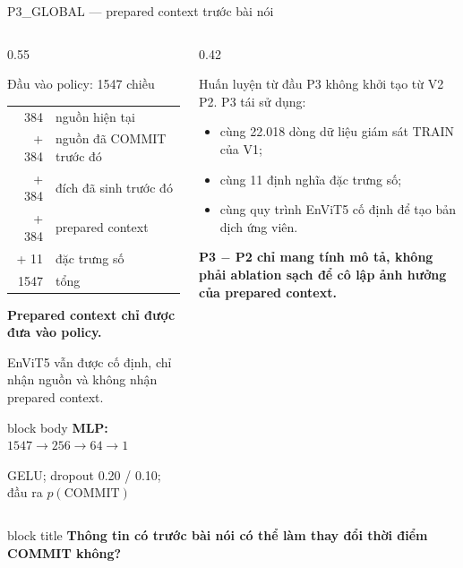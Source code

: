 \documentclass[aspectratio=169,11pt]{beamer}
\begin{document}
\begin{frame}{P3\_GLOBAL --- prepared context trước bài nói}
  \begin{columns}[T,onlytextwidth]
    \begin{column}{0.55\textwidth}
      \begin{block}{Đầu vào policy: 1547 chiều}
        \scriptsize
        \begin{tabular}{@{}rl@{}}
          384 & nguồn hiện tại \\
          + 384 & nguồn đã COMMIT trước đó \\
          + 384 & đích đã sinh trước đó \\
          + 384 & prepared context \\
          + 11 & đặc trưng số \\
          \midrule
          1547 & tổng
        \end{tabular}
      \end{block}
      \scriptsize
      \textbf{Prepared context chỉ được đưa vào policy.}\par
      EnViT5 vẫn được cố định, chỉ nhận nguồn và không nhận prepared context.
      \vspace{0.45em}
      \begin{beamercolorbox}[rounded=true,sep=0.45em,center]{block body}
        \textbf{MLP:} $1547 \rightarrow 256 \rightarrow 64 \rightarrow 1$\par
        \scriptsize GELU; dropout 0.20 / 0.10; đầu ra $p(\mathrm{COMMIT})$
      \end{beamercolorbox}
    \end{column}
    \begin{column}{0.42\textwidth}
      \begin{alertblock}{Huấn luyện từ đầu}
        \scriptsize P3 không khởi tạo từ V2 P2. P3 tái sử dụng:
        \begin{itemize}
          \item cùng 22.018 dòng dữ liệu giám sát TRAIN của V1;
          \item cùng 11 định nghĩa đặc trưng số;
          \item cùng quy trình EnViT5 cố định để tạo bản dịch ứng viên.
        \end{itemize}
      \end{alertblock}
      \centering\small
      \textbf{P3 $-$ P2 chỉ mang tính mô tả, không phải ablation sạch để cô lập ảnh hưởng của prepared context.}
    \end{column}
  \end{columns}
  \vfill
  \begin{beamercolorbox}[rounded=true,sep=0.5em,center]{block title}
    \textbf{Thông tin có trước bài nói có thể làm thay đổi thời điểm COMMIT không?}
  \end{beamercolorbox}
\end{frame}
\end{document}
